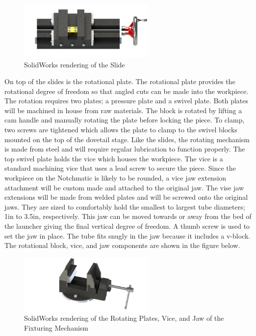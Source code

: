 \begin{figure}[H]
    \centering
    \includegraphics[width=0.6\textwidth]{./fall-report pictures/Chapter2-MachineDescription/Slide2}
    \caption{SolidWorks rendering of the Slide}
    \label{fig:Electrical:Slide}
\end{figure}

On top of the slides is the rotational plate. The rotational plate provides the rotational degree of freedom so that angled cuts can be made into the workpiece. The rotation requires two plates; a pressure plate and a swivel plate. Both plates will be machined in house from raw materials. The block is rotated by lifting a cam handle and manually rotating the plate before locking the piece. To clamp, two screws are tightened which allows the plate to clamp to the swivel blocks mounted on the top of the dovetail stage. Like the slides, the rotating mechanism is made from steel and will require regular lubrication to function properly. The top swivel plate holds the vice which houses the workpiece. The vice is a standard machining vice that uses a lead screw to secure the piece. Since the workpiece on the Notchmatic is likely to be rounded, a vice jaw extension attachment will be custom made and attached to the original jaw. The vise jaw extensions will be made from welded plates and will be screwed onto the original jaws. They are sized to comfortably hold the smallest to largest tube diameters; 1in to 3.5in, respectively. This jaw can be moved towards or away from the bed of the launcher giving the final vertical degree of freedom. A thumb screw is used to set the jaw in place. The tube fits snugly in the jaw because it includes a v-block. The rotational block, vice, and jaw components are shown in the figure below. 

\begin{figure}[H]
    \centering
    \includegraphics[width=0.6\textwidth]{./fall-report pictures/Chapter2-MachineDescription/Vice}
    \caption{SolidWorks rendering of the Rotating Plates, Vice, and Jaw of the Fixturing Mechanism}
    \label{fig:Electrical:Vice}
\end{figure}

